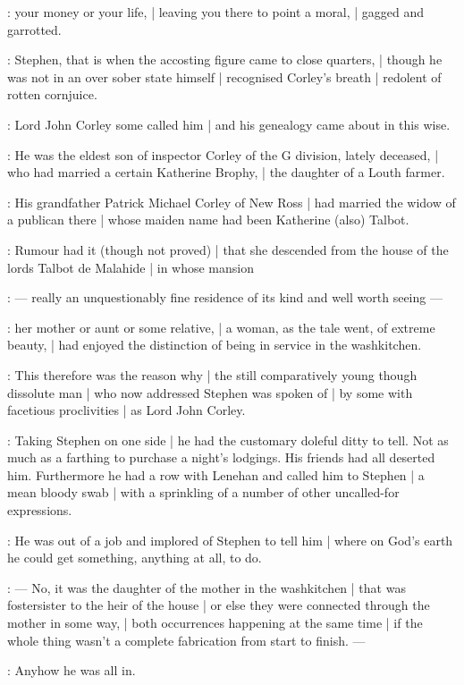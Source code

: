 :
your money or your life, |
leaving you there to point a moral, |
gagged and garrotted.

:
Stephen, that is when the accosting figure came to close quarters, |
though he was not in an over sober state himself |
recognised Corley's breath |
redolent of rotten cornjuice.

:
Lord John Corley some called him |
and his genealogy came about in this wise.

:
He was the eldest son of inspector Corley of the G division, lately deceased, |
who had married a certain Katherine Brophy, |
the daughter of a Louth farmer.

:
His grandfather Patrick Michael Corley of New Ross |
had married the widow of a publican there |
whose maiden name had been Katherine (also) Talbot.

:
Rumour had it (though not proved) |
that she descended from the house of the lords Talbot de Malahide |
in whose mansion

:
    --- really an unquestionably fine residence of its kind and well worth seeing ---

:
her mother or aunt or some relative, |
a woman, as the tale went, of extreme beauty, |
had enjoyed the distinction of being in service in the washkitchen.

:
This therefore was the reason why |
the still comparatively young though dissolute man |
who now addressed Stephen was spoken of |
by some with facetious proclivities |
as Lord John Corley.

:
Taking Stephen on one side |
he had the customary doleful ditty to tell.
Not as much as a farthing to purchase a night's lodgings.
His friends had all deserted him.
Furthermore he had a row with Lenehan and called him to Stephen |
a mean bloody swab |
with a sprinkling of a number of other uncalled-for expressions.

:
He was out of a job and implored of Stephen to tell him |
where on God's earth he could get something, anything at all, to do.

:
    --- No, it was the daughter of the mother in the washkitchen |
        that was fostersister to the heir of the house |
        or else they were connected through the mother in some way, |
        both occurrences happening at the same time |
        if the whole thing wasn't a complete fabrication from start to finish. ---

:
Anyhow he was all in.


